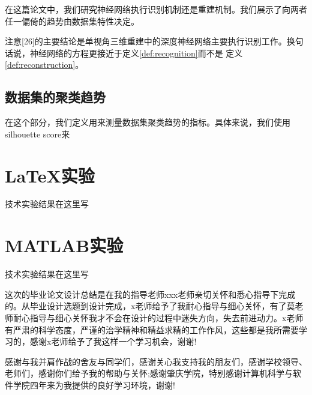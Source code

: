\documentclass[bachelor, nocolorlinks, printoneside]{seuthesis} %
\begin{document}
\begin{Main}
在这篇论文中，我们研究神经网络执行识别机制还是重建机制。我们展示了向两者任一偏倚的趋势由数据集特性决定。

注意[26]的主要结论是单视角三维重建中的深度神经网络主要执行识别工作。换句话说，神经网络的方程更接近于定义\ref{def:recognition}而不是
定义\ref{def:reconstruction}。
\section{数据集的聚类趋势}
\label{sec:metric_on_dataset}
在这个部分，我们定义用来测量数据集聚类趋势的指标。具体来说，我们使用silhouette score来
\end{Main} %




\begin{Appendix}{}
    \chapter{{\LaTeX}实验}
    技术实验结果在这里写
    \chapter{MATLAB实验}
    技术实验结果在这里写
\end{Appendix}

\begin{Acknowledgement}{}
    这次的毕业论文设计总结是在我的指导老师xxx老师亲切关怀和悉心指导下完成的。从毕业设计选题到设计完成，x老师给予了我耐心指导与细心关怀，有了莫老师耐心指导与细心关怀我才不会在设计的过程中迷失方向，失去前进动力。x老师有严肃的科学态度，严谨的治学精神和精益求精的工作作风，这些都是我所需要学习的，感谢x老师给予了我这样一个学习机会，谢谢!

    感谢与我并肩作战的舍友与同学们，感谢关心我支持我的朋友们，感谢学校领导、老师们，感谢你们给予我的帮助与关怀;感谢肇庆学院，特别感谢计算机科学与软件学院四年来为我提供的良好学习环境，谢谢!
\end{Acknowledgement}

\newpage
\printindex %



%
%
\end{document}
